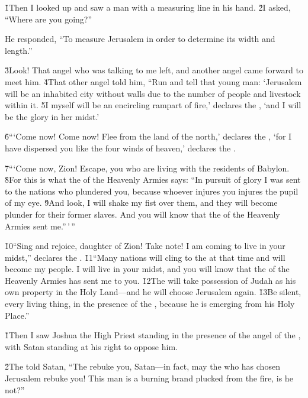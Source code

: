 \v{1}Then I looked up and saw a man with a measuring line in his hand. \v{2}I asked, ``Where are you going?''

He responded, ``To measure Jerusalem in order to determine its width and length.''

\v{3}Look! That angel who was talking to me left, and another angel came forward to meet him. \v{4}That other angel told him, ``Run and tell that young man: `Jerusalem will be an inhabited city without walls due to the number of people and livestock within it. \v{5}I myself will be an encircling rampart of fire,' declares the , `and I will be the glory in her midst.'

\v{6}```Come now! Come now! Flee from the land of the north,' declares the , `for I have dispersed you like the four winds of heaven,' declares the .

\v{7}```Come now, Zion! Escape, you who are living with the residents of Babylon. \v{8}For this is what the  of the Heavenly Armies says: ``In pursuit of glory I was sent to the nations who plundered you, because whoever injures you injures the pupil of my eye. \v{9}And look, I will shake my fist over them, and they will become plunder for their former slaves. And you will know that the  of the Heavenly Armies sent me.''\,'\,''

\v{10}``Sing and rejoice, daughter of Zion! Take note! I am coming to live in your midst,'' declares the . \v{11}``Many nations will cling to the  at that time and will become my people. I will live in your midst, and you will know that the  of the Heavenly Armies has sent me to you. \v{12}The  will take possession of Judah as his own property in the Holy Land---and he will choose Jerusalem again. \v{13}Be silent, every living thing, in the presence of the , because he is emerging from his Holy Place.''

\v{1}Then I saw Joshua the High Priest standing in the presence of the angel of the , with Satan standing at his right to oppose him.

\v{2}The  told Satan, ``The  rebuke you, Satan---in fact, may the  who has chosen Jerusalem rebuke you! This man is a burning brand plucked from the fire, is he not?''

